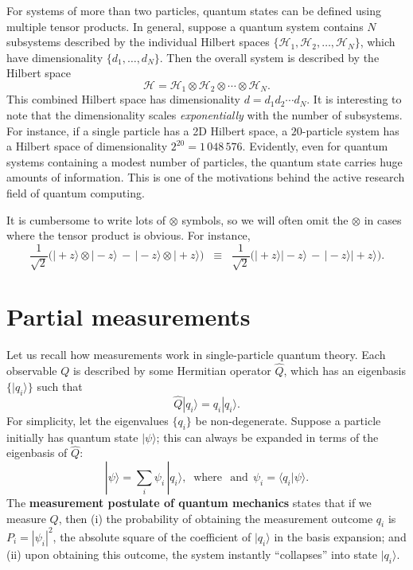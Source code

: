 \documentclass[pra,12pt]{revtex4}
\begin{document}
For systems of more than two particles, quantum states can be defined
using multiple tensor products.  In general, suppose a quantum system
contains $N$ subsystems described by the individual Hilbert spaces
$\{\mathscr{H}_1, \mathscr{H}_2, \dots, \mathscr{H}_N\}$, which have
dimensionality $\{d_1, \dots, d_N\}$.  Then the overall system is
described by the Hilbert space
\begin{equation}
  \mathscr{H} = \mathscr{H}_1 \otimes \mathscr{H}_2 \otimes \cdots
  \otimes \mathscr{H}_N.
\end{equation}
This combined Hilbert space has dimensionality $d = d_1 d_2\cdots
d_N$.  It is interesting to note that the dimensionality scales
\textit{exponentially} with the number of subsystems.  For instance,
if a single particle has a 2D Hilbert space, a $20$-particle system
has a Hilbert space of dimensionality $2^{20} =1\,048\,576$.
Evidently, even for quantum systems containing a modest number of
particles, the quantum state carries huge amounts of information.
This is one of the motivations behind the active research field of
quantum computing.

It is cumbersome to write lots of $\otimes$ symbols, so we will often
omit the $\otimes$ in cases where the tensor product is obvious.  For
instance,
\begin{equation}
  \frac{1}{\sqrt{2}} \Big(|\!+\!z\rangle\otimes|\!-\!z\rangle \,-\, |\!-\!z\rangle\otimes|\!+\!z\rangle\Big) \;\;\equiv \;\; \frac{1}{\sqrt{2}} \Big(|\!+\!z\rangle|\!-\!z\rangle \,-\, |\!-\!z\rangle|\!+\!z\rangle\Big).
\end{equation}


\section{Partial measurements}
\label{sec:partialmeasurements}

Let us recall how measurements work in single-particle quantum theory.
Each observable $Q$ is described by some Hermitian operator $\hat{Q}$,
which has an eigenbasis $\{|q_i\rangle\}$ such that
\begin{equation}
  \hat{Q}|q_i\rangle = q_i |q_i\rangle.
\end{equation}
For simplicity, let the eigenvalues $\{q_i\}$ be non-degenerate.
Suppose a particle initially has quantum state $|\psi\rangle$; this
can always be expanded in terms of the eigenbasis of $\hat{Q}$:
\begin{equation}
  |\psi\rangle = \sum_i \psi_i\, |q_i\rangle, \;\;\mathrm{where}\;\;\,\textrm{and}\;\, \psi_i = \langle q_i|\psi\rangle.
\end{equation}
The \textbf{measurement postulate of quantum mechanics} states that if
we measure $Q$, then (i) the probability of obtaining the measurement
outcome $q_i$ is $P_i = |\psi_i|^2$, the absolute square of the
coefficient of $|q_i\rangle$ in the basis expansion; and (ii) upon
obtaining this outcome, the system instantly ``collapses'' into state
$|q_i\rangle$.
\end{document}
